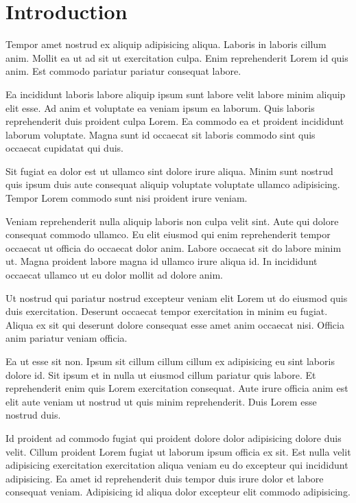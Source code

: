 \section{Introduction}
Tempor amet nostrud ex aliquip adipisicing aliqua. Laboris in laboris cillum anim. Mollit ea ut ad sit ut exercitation culpa. Enim reprehenderit Lorem id quis anim. Est commodo pariatur pariatur consequat labore.

Ea incididunt laboris labore aliquip ipsum sunt labore velit labore minim aliquip elit esse. Ad anim et voluptate ea veniam ipsum ea laborum. Quis laboris reprehenderit duis proident culpa Lorem. Ea commodo ea et proident incididunt laborum voluptate. Magna sunt id occaecat sit laboris commodo sint quis occaecat cupidatat qui duis.

Sit fugiat ea dolor est ut ullamco sint dolore irure aliqua. Minim sunt nostrud quis ipsum duis aute consequat aliquip voluptate voluptate ullamco adipisicing. Tempor Lorem commodo sunt nisi proident irure veniam.

Veniam reprehenderit nulla aliquip laboris non culpa velit sint. Aute qui dolore consequat commodo ullamco. Eu elit eiusmod qui enim reprehenderit tempor occaecat ut officia do occaecat dolor anim. Labore occaecat sit do labore minim ut. Magna proident labore magna id ullamco irure aliqua id. In incididunt occaecat ullamco ut eu dolor mollit ad dolore anim.

Ut nostrud qui pariatur nostrud excepteur veniam elit Lorem ut do eiusmod quis duis exercitation. Deserunt occaecat tempor exercitation in minim eu fugiat. Aliqua ex sit qui deserunt dolore consequat esse amet anim occaecat nisi. Officia anim pariatur veniam officia.

Ea ut esse sit non. Ipsum sit cillum cillum cillum ex adipisicing eu sint laboris dolore id. Sit ipsum et in nulla ut eiusmod cillum pariatur quis labore. Et reprehenderit enim quis Lorem exercitation consequat. Aute irure officia anim est elit aute veniam ut nostrud ut quis minim reprehenderit. Duis Lorem esse nostrud duis.

Id proident ad commodo fugiat qui proident dolore dolor adipisicing dolore duis velit. Cillum proident Lorem fugiat ut laborum ipsum officia ex sit. Est nulla velit adipisicing exercitation exercitation aliqua veniam eu do excepteur qui incididunt adipisicing. Ea amet id reprehenderit duis tempor duis irure dolor et labore consequat veniam. Adipisicing id aliqua dolor excepteur elit commodo adipisicing.

